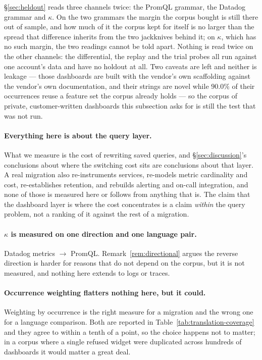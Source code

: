 \S\ref{sec:heldout} reads three channels twice: the PromQL grammar, the Datadog grammar
and $\kappa$. On the two grammars the margin the corpus bought is still there out of
sample, and how much of it the corpus kept for itself is no larger than the spread that
difference inherits from the two jackknives behind it; on $\kappa$, which has no such
margin, the two readings cannot be told apart. Nothing is read twice
on the other channels: the differential, the replay and the trial probes all run against
one account's data and have no holdout at all. Two caveats are left and neither is leakage --- those
dashboards are built with the vendor's own scaffolding against the vendor's own
documentation, and their strings are novel while $90.0\%$ of their occurrences reuse a
feature set the corpus already holds --- so the corpus of private, customer-written
dashboards this subsection asks for is still the test that was not run.

\paragraph{Everything here is about the query layer.}
What we measure is the cost of rewriting saved queries, and \S\ref{sec:discussion}'s
conclusions about where the switching cost sits are conclusions about that layer. A real
migration also re-instruments services, re-models metric cardinality and cost,
re-establishes retention, and rebuilds alerting and on-call integration, and none of
those is measured here or follows from anything that is. The claim that the dashboard
layer is where the cost concentrates is a claim \emph{within} the query problem, not a
ranking of it against the rest of a migration.

\paragraph{$\kappa$ is measured on one direction and one language pair.}
Datadog metrics $\to$ PromQL. Remark~\ref{rem:directional} argues the reverse direction
is harder for reasons that do not depend on the corpus, but it is not measured, and
nothing here extends to logs or traces.

\paragraph{Occurrence weighting flatters nothing here, but it could.}
Weighting by occurrence is the right measure for a migration and the wrong one for a
language comparison. Both are reported in Table~\ref{tab:translation-coverage} and they
agree to within a tenth of a point, so the choice happens not to matter; in a corpus
where a single refused widget were duplicated across hundreds of dashboards it would
matter a great deal.

